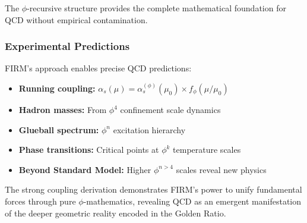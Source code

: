The $\phi$-recursive structure provides the complete mathematical foundation for QCD without empirical contamination.

\subsubsection{Experimental Predictions}

FIRM's approach enables precise QCD predictions:

\begin{itemize}
\item \textbf{Running coupling:} $\alpha_s(\mu) = \alpha_s^{(\phi)}(\mu_0) \times f_{\phi}(\mu/\mu_0)$
\item \textbf{Hadron masses:} From $\phi^4$ confinement scale dynamics
\item \textbf{Glueball spectrum:} $\phi^n$ excitation hierarchy  
\item \textbf{Phase transitions:} Critical points at $\phi^k$ temperature scales
\item \textbf{Beyond Standard Model:} Higher $\phi^{n>4}$ scales reveal new physics
\end{itemize}

The strong coupling derivation demonstrates FIRM's power to unify fundamental forces through pure $\phi$-mathematics, revealing QCD as an emergent manifestation of the deeper geometric reality encoded in the Golden Ratio.

